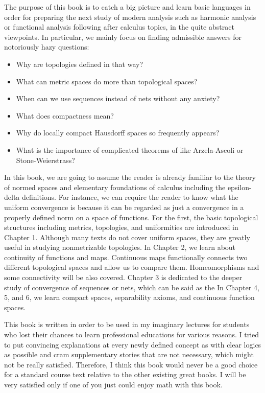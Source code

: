 \documentclass{../crs}
\begin{document}
The purpose of this book is to catch a big picture and learn basic languages in order for preparing the next study of modern analysis such as harmonic analysis or functional analysis following after calculus topics, in the quite abstract viewpoints.
In particular, we mainly focus on finding admissible answers for notoriously hazy questions:
\begin{itemize}
\item Why are topologies defined in that way?
\item What can metric spaces do more than topological spaces?
\item When can we use sequences instead of nets without any anxiety? 
\item What does compactness mean?
\item Why do locally compact Hausdorff spaces so frequently appears?
\item What is the importance of complicated theorems of like Arzela-Ascoli or Stone-Weierstrass?
\end{itemize}

In this book, we are going to assume the reader is already familiar to the theory of normed spaces and elementary foundations of calculus including the epsilon-delta definitions.
For instance, we can require the reader to know what the uniform convergence is because it can be regarded as just a convergence in a properly defined norm on a space of functions.
For the first, the basic topological structures including metrics, topologies, and uniformities are introduced in Chapter 1.
Although many texts do not cover uniform spaces, they are greatly useful in studying nonmetrizable topologies.
In Chapter 2, we learn about continuity of functions and maps.
Continuous maps functionally connects two different topological spaces and allow us to compare them.
Homeomorphisms and some connectivity will be also covered.
Chapter 3 is dedicated to the deeper study of convergence of sequences or nets, which can be said as the 
In Chapter 4, 5, and 6, we learn compact spaces, separability axioms, and continuous function spaces.

This book is written in order to be used in my imaginary lectures for students who lost their chances to learn professional educations for various reasons.
I tried to put convincing explanations at every newly defined concept as with clear logics as possible and cram supplementary stories that are not necessary, which might not be really satisfied.
Therefore, I think this book would never be a good choice for a standard course text relative to the other existing great books.
I will be very satisfied only if one of you just could enjoy math with this book.
\end{document}
